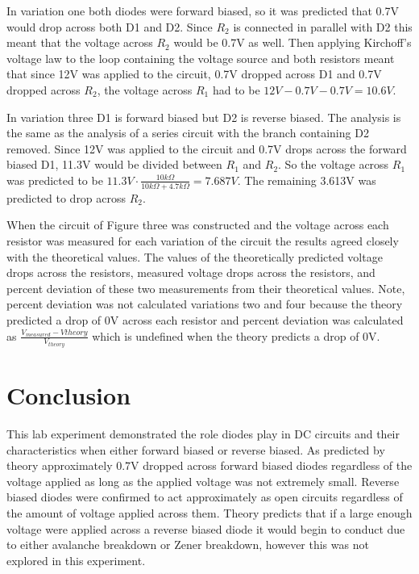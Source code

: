 \documentclass{article}
\begin{document}
In variation one both diodes were forward biased, so it was predicted that 0.7V would drop across both D1 and D2.  Since $R_2$ is connected in parallel with D2 this meant that the voltage across $R_2$ would be 0.7V as well.  Then applying Kirchoff's voltage law to the loop containing the voltage source and both resistors meant that since 12V was applied to the circuit, 0.7V dropped across D1 and 0.7V dropped across $R_2$, the voltage across $R_1$ had to be $12V-0.7V-0.7V=10.6V$.

In variation three D1 is forward biased but D2 is reverse biased.  The analysis is the same as the analysis of a series circuit with the branch containing D2 removed.  Since 12V was applied to the circuit and 0.7V drops across the forward biased D1, 11.3V would be divided between $R_1$ and $R_2$.  So the voltage across $R_1$ was predicted to be $11.3V\cdot \frac{10k\Omega}{10k\Omega +4.7k\Omega}=7.687V$.  The remaining 3.613V was predicted to drop across $R_2$.

When the circuit of Figure three was constructed and the voltage across each resistor was measured for each variation of the circuit the results agreed closely with the theoretical values.  The values of the theoretically predicted voltage drops across the resistors, measured voltage drops across the resistors, and percent deviation of these two measurements from their theoretical values.  Note, percent deviation was not calculated variations two and four because the theory predicted a drop of 0V across each resistor and percent deviation was calculated as $\frac{V_{measured}-V{theory}}{V_{theory}}$ which is undefined when the theory predicts a drop of 0V.

\section*{Conclusion}
This lab experiment demonstrated the role diodes play in DC circuits and their characteristics when either forward biased or reverse biased.  As predicted by theory approximately 0.7V dropped across forward biased diodes regardless of the voltage applied as long as the applied voltage was not extremely small.  Reverse biased diodes were confirmed to act approximately as open circuits regardless of the amount of voltage applied across them.  Theory predicts that if a large enough voltage were applied across a reverse biased diode it would begin to conduct due to either avalanche breakdown or Zener breakdown, however this was not explored in this experiment.
\pagebreak
\end{document}

